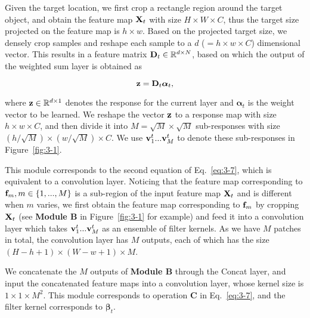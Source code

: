 \documentclass[10pt,twocolumn,letterpaper]{article}
\begin{document}
Given the target location, we first crop a rectangle region around the target object,
and obtain the feature map ${\bf X}_t$ with size
$H\times W\times C$, thus the target size projected on the feature map is $h\times w$. Based on the projected target size, we densely
crop samples and reshape each sample to a $d$ ($=h\times w\times C$) dimensional vector.
This results in a feature matrix ${\bf D}_t\in \mathbb{R}^{d\times N}$, based on which the
output of the weighted sum layer is obtained as
\begin{small}
\begin{equation}
{\bf z}={\bf D}_t{\bm \alpha}_t,
\end{equation}
\end{small}
where ${\bf z}\in \mathbb{R}^{d\times 1}$ denotes the response for the current layer and
${\bm \alpha}_t$ is the weight vector to be learned. We reshape the vector ${\bf z}$ to
a response map with size $h\times w\times C$, and then divide it into $M=\sqrt{M}\times \sqrt{M}$
sub-responses with size $(h/\sqrt{M})\times (w/\sqrt{M})\times C$. We use ${\bf v}_1^t...{\bf v}_M^t$
to denote these sub-responses in Figure~\ref{fig:3-1}.

\vspace{1mm}
This module corresponds to the second equation of Eq.~\ref{eq:3-7},
which is equivalent to a convolution layer.
Noticing that the feature map corresponding to ${\bf f}_m, m\in\{1,...,M\}$ is a sub-region of
the input feature map ${\bf X}_t$ and is different when $m$ varies, we
first obtain the feature
map corresponding to ${\bf f}_m$ by cropping ${\bf X}_t$ (see \textbf{Module B} in
Figure~\ref{fig:3-1} for example) and feed it into a convolution
layer which takes ${\bf v}_1^t...{\bf v}_M^t$ as an ensemble of filter kernels.
As we have $M$ patches in total, the convolution layer has $M$ outputs, each of which has
the size $(H-h+1)\times (W-w+1) \times M$.

\vspace{1mm}
We concatenate the $M$ outputs of \textbf{Module B} through the
Concat layer, and input the concatenated feature maps into a convolution layer, whose kernel
size is $1\times 1 \times M^2$. This module corresponds to operation \textbf{C} in Eq.~\ref{eq:3-7},
and the filter kernel corresponds to ${\bm \beta}_t$.
\end{document}

